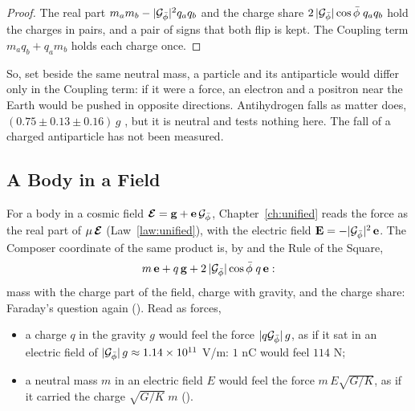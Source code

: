 \begin{proof}
The real part $m_a m_b - |\mathcal{G}_{\bar{\phi}}|^2 q_a q_b$ and the charge share $2\,|\mathcal{G}_{\bar{\phi}}|\cos\bar{\phi}\;q_a q_b$ hold the charges in pairs, and a pair of signs that both flip is kept. The Coupling term $m_a q_b + q_a m_b$ holds each charge once.
\end{proof}

So, set beside the same neutral mass, a particle and its antiparticle would differ only in the Coupling term: if it were a force, an electron and a positron near the Earth would be pushed in opposite directions. Antihydrogen falls as matter does, $(0.75 \pm 0.13 \pm 0.16)\,g$ \citep{Anderson2023}, but it is neutral and tests nothing here. The fall of a charged antiparticle has not been measured.

\subsection{A Body in a Field}\label{subsec:op-field}

For a body in a cosmic field $\boldsymbol{\mathcal{E}} = \mathbf{g} + \mathbf{e}\,\mathcal{G}_{\bar{\phi}}$, Chapter~\ref{ch:unified} reads the force as the real part of $\mu\,\boldsymbol{\mathcal{E}}$ (Law~\ref{law:unified}), with the electric field $\mathbf{E} = -|\mathcal{G}_{\bar{\phi}}|^2\,\mathbf{e}$. The Composer coordinate of the same product is, by  and the Rule of the Square,
\[
m\,\mathbf{e} + q\,\mathbf{g} + 2\,|\mathcal{G}_{\bar{\phi}}|\cos\bar{\phi}\;q\,\mathbf{e} :
\]
mass with the charge part of the field, charge with gravity, and the charge share: Faraday's question again (). Read as forces,
\begin{itemize}
  \item a charge $q$ in the gravity $g$ would feel the force $|q\mathcal{G}_{\bar{\phi}}|\,g$, as if it sat in an electric field of $|\mathcal{G}_{\bar{\phi}}|\,g \approx 1.14 \times 10^{11}$ V/m: $1$ nC would feel $114$ N;
  \item a neutral mass $m$ in an electric field $E$ would feel the force $m\,E\sqrt{G/K}$, as if it carried the charge $\sqrt{G/K}\;m$ ().
\end{itemize}

